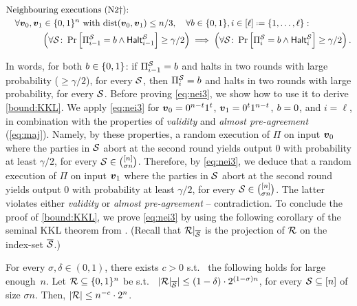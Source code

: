 \begin{align}\label{eq:nei3}
&\text{Neighbouring executions (N2$\dagger$):}\\
&\quad \forall \vz,\vo \in \zn \text{ with } \ham(\vz,\vo)\le n/3, \quad \forall \o\in \zo,i\in [\ell] \assign \set{1,\ldots,\ell}\colon\nonumber\\
&\qquad\qquad \left (\forall \cS\colon \pr{\Pi^\cS_{i-1}=\o \land \halt^{\cS}_{i-1}} \ge \gamma/2 \right) \implies \left(\forall \cS\colon\pr{\Pi^\cS_{i}=\o \land \halt^{\cS}_{i}}\ge \gamma/2\right). \nonumber
\end{align}

\noindent
In words, for both $b\in \{0,1\}$: if $\Pi_{i-1}^{\mathcal{S}}=b$ and halts in two rounds with large probability ($\ge \gamma/2$), for every $\mathcal{S}$, then $\Pi_i^{\mathcal{S}}=b$ and halts in two rounds with large probability, for every $\mathcal{S}$. Before proving \cref{eq:nei3}, we show how to use it to derive \cref{bound:KKL}. We apply \cref{eq:nei3} for
${ \boldsymbol{v}}_0=0^{n-t}1^{t}$, ${ \boldsymbol{v}}_1=0^{t}1^{n-t}$, $b=0$, and $i=\ell$, in combination with the properties of \emph{validity} and \emph{almost pre-agreement}
(\cref{eq:maj}). Namely, by these properties,
a random execution of $\Pi$ on input ${ \boldsymbol{v}}_0$ where the parties in $\mathcal{S}$ abort at the second round yields output $0$ with probability at least $\gamma/2$, for every $\mathcal{S}\in {\binom{[n]}{\sigma n}}$.
Therefore, by \cref{eq:nei3},
we deduce that a random execution of $\Pi$ on input ${ \boldsymbol{v}}_1$ where the parties in $\mathcal{S}$ abort at the second round yields output $0$ with probability at least $\gamma/2$, for every $\mathcal{S}\in {\binom{[n]}{\sigma n}}$. The latter violates either \emph{validity} or \emph{almost pre-agreement} -- contradiction.
To conclude the proof of \cref{bound:KKL}, we prove \cref{eq:nei3} by using the following corollary of the seminal KKL theorem \cite{KKL88} from \citet{BKK14}.
(Recall that $\mathcal{R}|_{\overline{\mathcal{S}}}$ is the projection of $\mathcal{R}$ on the index-set $\overline{\mathcal{S}}$.)

\begin{lemma}\label{lem:KKL} For every $\sigma, \delta\in (0,1)$, there exists $c>0$ s.t.\
the following holds for large enough~$n$. Let $\mathcal{R} \subseteq {\{0,1\}^n}$ be s.t.\
$|\mathcal{R}|_{\overline{\mathcal{S}}}|\le (1-\delta)\cdot 2^{(1-\sigma)n}$, for every $\mathcal{S}\subseteq [n]$ of size $\sigma n$. Then, $\left|\mathcal{R}\right|\le n^{-c}\cdot 2^n$.
\end{lemma}

